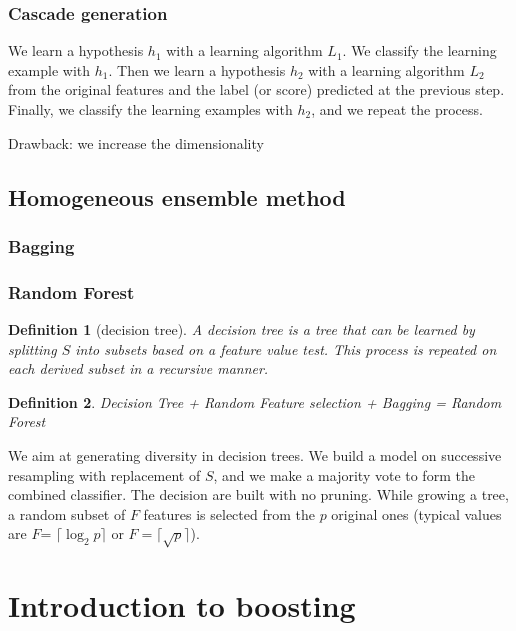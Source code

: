 \documentclass{article}
\newtheorem{defi}{Definition}
\begin{document}
\subsubsection{Cascade generation}
We learn a hypothesis $h_1$ with a learning algorithm $L_1$. We classify the learning example with $h_1$. Then we learn a hypothesis $h_2$ with a learning algorithm $L_2$ from the original features and the label (or score) predicted at the previous step. Finally, we classify the learning examples with $h_2$, and we repeat the process.


Drawback: we increase the dimensionality


\subsection{Homogeneous ensemble method}
\subsubsection{Bagging}
\begin{algorithm}
\end{algorithm}

\subsubsection{Random Forest}
\begin{defi}[decision tree]
A decision tree is a tree that can be learned by splitting $S$ into subsets based on a feature value test. This process is repeated on each derived subset in a recursive manner.
\end{defi}

\begin{defi}
Decision Tree + Random Feature selection + Bagging = Random Forest
\end{defi}

We aim at generating diversity in decision trees. We build a model on successive resampling with replacement of $S$, and we make a majority vote to form the combined classifier. The decision are built with no pruning. While growing a tree, a random subset of $F$ features is selected from the $p$ original ones (typical values are $F$= $\lceil \log_2 p \rceil$ or $F=\lceil \sqrt{p}\rceil$).

\section{Introduction to boosting}
\end{document}
